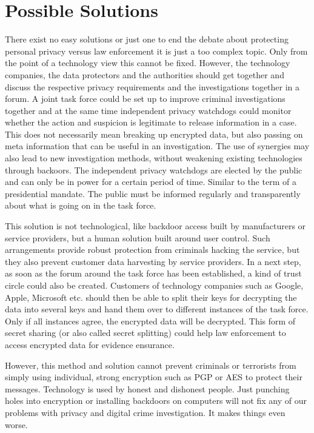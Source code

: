 \documentclass[a4paper, 11pt]{article}
\begin{document}
\section*{Possible Solutions}
There exist no easy solutions or just one to end the debate about protecting personal privacy versus law enforcement it is just a too complex topic. Only from the point of a technology view this cannot be fixed. However, the technology companies, the data protectors and the authorities should get together and discuss the respective privacy requirements and the investigations together in a forum. A joint task force could be set up to improve criminal investigations together and at the same time independent privacy watchdogs could monitor whether the action and suspicion is legitimate to release information in a case. This does not necessarily mean breaking up encrypted data, but also passing on meta information that can be useful in an investigation.
The use of synergies may also lead to new investigation methods, without weakening existing technologies through backoors. The independent privacy watchdogs are elected by the public and can only be in power for a certain period of time. Similar to the term of a presidential mandate. The public must be informed regularly and transparently about what is going on in the task force.
\par This solution is not technological, like backdoor access built by manufacturers or service providers, but a human solution built around user control. Such arrangements provide robust protection from criminals hacking the service, but they also prevent customer data harvesting by service providers. In a next step, as soon as the forum around the task force has been established, a kind of trust circle could also be created. Customers of technology companies such as Google, Apple, Microsoft etc. should then be able to split their keys for decrypting the data into several keys and hand them over to different instances of the task force. Only if all instances agree, the encrypted data will be decrypted. This form of secret sharing (or also called secret splitting) could help law enforcement to access encrypted data for evidence ensurance.
\par However, this method and solution cannot prevent criminals or terrorists from simply using individual, strong encryption such as PGP or AES to protect their messages. Technology is used by honest and dishonest people. Just punching holes into encryption or installing backdoors on computers will not fix any of our problems with privacy and digital crime investigation. It makes things even worse.
\end{document}
